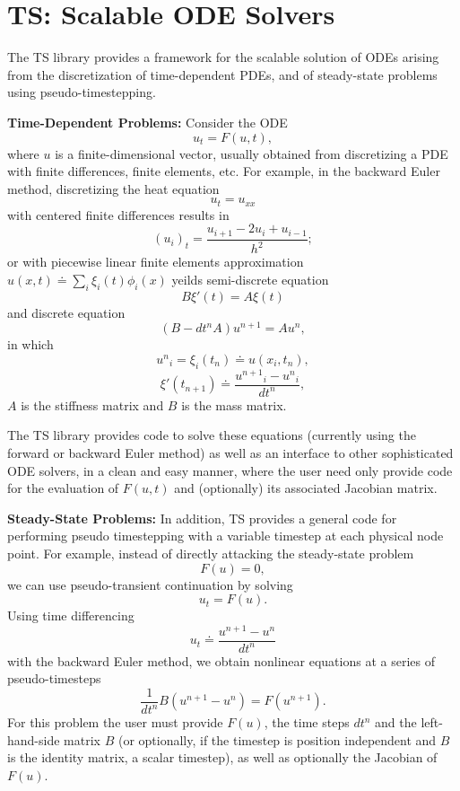 \cleardoublepage
\chapter{TS: Scalable ODE Solvers}
\label{chapter_ts}

The TS library provides a framework for the scalable solution of ODEs
arising from the discretization of time-dependent PDEs, and of
steady-state problems using pseudo-timestepping.

\vspace{.2cm}

\noindent

{\bf Time-Dependent Problems:} Consider the ODE
\[
              u_t = F(u,t),
\]
where $ u $ is a finite-dimensional vector, usually obtained from
discretizing a PDE with finite differences, finite elements, etc.
For example, in the backward Euler method, discretizing the heat equation 
\[
          u_t = u_{xx} 
\]
with centered finite differences results in 
\[
          (u_i)_t = \frac{u_{i+1} - 2 u_{i} + u_{i-1}}{h^2};
\]
or with piecewise linear finite elements approximation
$ u(x,t) \doteq \sum_i \xi_i(t) \phi_i(x)$ yeilds semi-discrete equation
\[
          B {\xi}'(t) = A \xi(t)
\]
and discrete equation
\[
        ( B - dt^n A  ) u^{n+1} = A u^n, 
\]
in which 
\[
         {u^n}_i = \xi_i(t_n) \doteq u(x_i,t_n),
\]
\[  
         {\xi}'(t_{n+1}) \doteq \frac{{u^{n+1}}_i - {u^{n}}_i }{dt^{n}},
\]
$A$ is the stiffness matrix and $B$ is the mass matrix.

The TS library provides code to solve these equations (currently 
using the forward or backward Euler method) as well as an interface to 
other sophisticated ODE solvers, in a clean and easy manner,
where the user need only provide code for the evaluation of $ F(u,t) $ and 
(optionally) its associated Jacobian matrix.

\vspace{.2cm}

\noindent
{\bf Steady-State Problems:} 
In addition, TS provides a general code for performing pseudo timestepping
with a variable timestep at each physical node point. For example, instead of
directly attacking the steady-state problem
\[
           F(u) = 0,
\]
we can use pseudo-transient continuation by solving
\[
           u_t = F(u).
\]
Using time differencing 
\[
   u_t \doteq \frac{{u^{n+1}} - {u^{n}} }{dt^{n}}
\]
with the backward Euler method, we obtain
nonlinear equations at a series of pseudo-timesteps
\[
           \frac{1}{dt^n} B (u^{n+1} - u^{n} ) = F(u^{n+1}).
\]
For this problem the user must provide $F(u)$,
the time steps $dt^{n}$ and the left-hand-side matrix $B$
(or optionally, if the timestep is position independent and $B$ is the
identity matrix,
a scalar timestep), as well as optionally the Jacobian of $F(u)$. 

